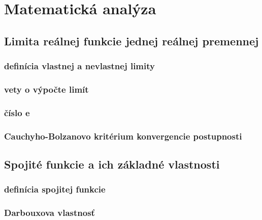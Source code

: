 \chapter[Matematická analýza]{Matematická analýza}
\label{matematicka_analyza} %

\section{Limita reálnej funkcie jednej reálnej premennej}
\subsection{definícia vlastnej a nevlastnej limity}
\subsection{vety o výpočte limít}
\subsection{číslo e}
\subsection{Cauchyho-Bolzanovo kritérium konvergencie postupnosti}


\section{Spojité funkcie a ich základné vlastnosti}
\subsection{definícia spojitej funkcie}
\subsection{Darbouxova vlastnosť}
